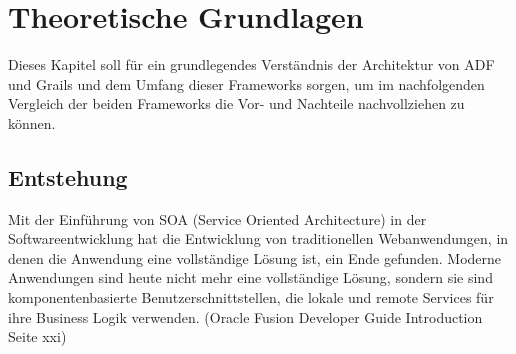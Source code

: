 \section{Theoretische Grundlagen}
Dieses Kapitel soll für ein grundlegendes Verständnis der Architektur von ADF und Grails und dem Umfang dieser Frameworks sorgen, um im nachfolgenden Vergleich der beiden Frameworks die Vor- und Nachteile nachvollziehen zu können.
\subsection{Entstehung}
Mit der Einführung von SOA (Service Oriented Architecture) in der Softwareentwicklung hat die Entwicklung von traditionellen Webanwendungen, in denen die Anwendung eine vollständige Lösung ist, ein Ende gefunden. Moderne Anwendungen sind heute nicht mehr eine vollständige Lösung, sondern sie sind komponentenbasierte Benutzerschnittstellen, die lokale und remote Services für ihre Business Logik verwenden. (Oracle Fusion Developer Guide Introduction Seite xxi)

